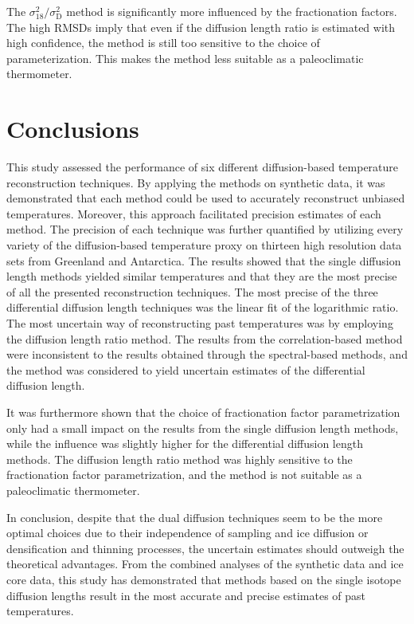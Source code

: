 \documentclass[11pt, draftcls, onecolumn]{IEEEtran} %
\numberwithin{equation}{section}
\numberwithin{table}{section}
\numberwithin{figure}{section}
\begin{document}
The ${\sigma^2_{18}}/{\sigma^2_\mathrm{D}}$ method is significantly more influenced by the 
fractionation factors. 
The high RMSDs imply that even if the diffusion length ratio is estimated with high confidence,
the method is still too sensitive to the choice of parameterization.
This makes the method less suitable as a paleoclimatic thermometer. 



\section{Conclusions}  %
This study assessed the performance of six different diffusion-based temperature reconstruction
techniques.
By applying the methods on synthetic data, it was demonstrated that each method could be used to accurately reconstruct unbiased temperatures.
Moreover, this approach facilitated precision estimates of each method.
The precision of each technique was further quantified by
utilizing every variety of the diffusion-based temperature proxy on thirteen high resolution 
data sets from Greenland and Antarctica.
The results showed that the single diffusion length methods yielded similar temperatures
and that they are the most precise of all the presented reconstruction techniques.
The most precise of the three differential diffusion length techniques was the linear fit of
the logarithmic ratio.
The most uncertain way of reconstructing past temperatures was by employing the diffusion length ratio method.
The results from the correlation-based method were inconsistent to the results obtained through the spectral-based methods,
and the method was considered to yield uncertain estimates of the differential diffusion length.

It was furthermore shown that the choice of fractionation factor parametrization 
only had a small impact on the results from the single diffusion length methods, 
while the influence was slightly higher for the differential diffusion length methods.
The diffusion length ratio method was highly sensitive to the fractionation factor parametrization,
and the method is not suitable as a paleoclimatic thermometer. 

In conclusion, despite that the dual diffusion techniques seem to be the more optimal choices 
due to their independence of sampling and ice diffusion or densification and thinning processes,
the uncertain estimates should outweigh the theoretical advantages.
From the combined analyses of the synthetic data and ice core data, this study has demonstrated that methods 
based on the single isotope diffusion lengths result in the most accurate and precise estimates of past temperatures.	
\end{document}
